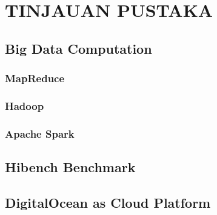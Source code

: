 \chapter{TINJAUAN PUSTAKA}
\section{Big Data Computation}
\subsection{MapReduce}

\subsection{Hadoop}
\subsection{Apache Spark}
\section{Hibench Benchmark}
\section{DigitalOcean as Cloud Platform}